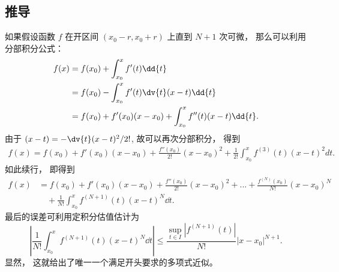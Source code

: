 \subsection{推导}
如果假设函数 $f$ 在开区间 $(x_0-r,x_0+r)$ 上直到 $N+1$ 次可微， 那么可以利用分部积分公式：
\begin{equation}
\begin{aligned}
f(x)
&=f(x_0)+\int_{x_0}^{x}f'(t)\dd{t}\\
&=f(x_0)-\int_{x_0}^{x}f'(t)\dv{t}(x-t) \dd{t}\\
&=f(x_0)+f'(x_0)(x-x_0)+\int_{x_0}^{x}f''(t)(x-t) \dd{t}.
\end{aligned}
\end{equation}
由于 $(x-t)=-\dv{t} (x-t)^2/2!$, 故可以再次分部积分， 得到
\begin{equation}
\begin{aligned}
f(x)
=f(x_0)+f'(x_0)(x-x_0)+\frac{f''(x_0)}{2!}(x-x_0)^2
+\frac{1}{2!}\int_{x_0}^{x}f^{(3)}(t)(x-t)^2dt.
\end{aligned}
\end{equation}
如此续行， 即得到
\begin{equation}
\begin{aligned}
f(x)
&=f(x_0)+f'(x_0)(x-x_0)+\frac{f''(x_0)}{2!}(x-x_0)^2+...+\frac{f^{(N)}(x_0)}{N!}(x-x_0)^N\\
&\quad+\frac{1}{N!}\int_{x_0}^{x}f^{(N+1)}(t)(x-t)^{N} \dd{t}.
\end{aligned}
\end{equation}
最后的误差可利用定积分估值估计为
\begin{equation}
\left|\frac{1}{N!}\int_{x_0}^{x}f^{(N+1)}(t)(x-t)^{N} \dd{t} \right|
\leq\frac{\sup_{t\in I}|f^{(N+1)}(t)|}{N!}|x-x_0|^{N+1}.
\end{equation}
显然， 这就给出了唯一一个满足开头要求的多项式近似。